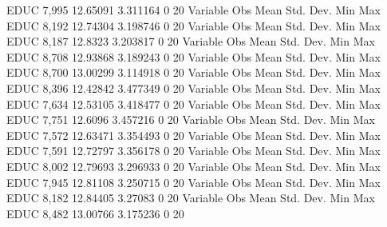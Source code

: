         EDUC {\VBAR}      7,995    12.65091    3.311164          0         20
{\smallskip}
    Variable {\VBAR}        Obs        Mean    Std. Dev.       Min        Max
        EDUC {\VBAR}      8,192    12.74304    3.198746          0         20
{\smallskip}
    Variable {\VBAR}        Obs        Mean    Std. Dev.       Min        Max
        EDUC {\VBAR}      8,187     12.8323    3.203817          0         20
{\smallskip}
    Variable {\VBAR}        Obs        Mean    Std. Dev.       Min        Max
        EDUC {\VBAR}      8,708    12.93868    3.189243          0         20
{\smallskip}
    Variable {\VBAR}        Obs        Mean    Std. Dev.       Min        Max
        EDUC {\VBAR}      8,700    13.00299    3.114918          0         20
{\smallskip}
    Variable {\VBAR}        Obs        Mean    Std. Dev.       Min        Max
        EDUC {\VBAR}      8,396    12.42842    3.477349          0         20
{\smallskip}
    Variable {\VBAR}        Obs        Mean    Std. Dev.       Min        Max
        EDUC {\VBAR}      7,634    12.53105    3.418477          0         20
{\smallskip}
    Variable {\VBAR}        Obs        Mean    Std. Dev.       Min        Max
        EDUC {\VBAR}      7,751     12.6096    3.457216          0         20
{\smallskip}
    Variable {\VBAR}        Obs        Mean    Std. Dev.       Min        Max
        EDUC {\VBAR}      7,572    12.63471    3.354493          0         20
{\smallskip}
    Variable {\VBAR}        Obs        Mean    Std. Dev.       Min        Max
        EDUC {\VBAR}      7,591    12.72797    3.356178          0         20
{\smallskip}
    Variable {\VBAR}        Obs        Mean    Std. Dev.       Min        Max
        EDUC {\VBAR}      8,002    12.79693    3.296933          0         20
{\smallskip}
    Variable {\VBAR}        Obs        Mean    Std. Dev.       Min        Max
        EDUC {\VBAR}      7,945    12.81108    3.250715          0         20
{\smallskip}
    Variable {\VBAR}        Obs        Mean    Std. Dev.       Min        Max
        EDUC {\VBAR}      8,182    12.84405     3.27083          0         20
{\smallskip}
    Variable {\VBAR}        Obs        Mean    Std. Dev.       Min        Max
        EDUC {\VBAR}      8,482    13.00766    3.175236          0         20
